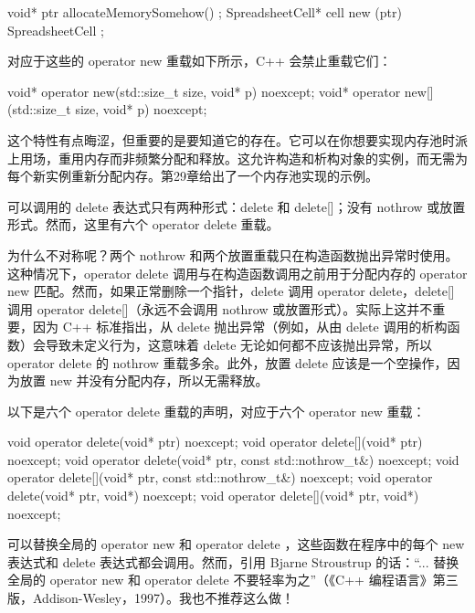 \begin{cpp}
void* ptr { allocateMemorySomehow() };
SpreadsheetCell* cell { new (ptr) SpreadsheetCell {} };
\end{cpp}

对应于这些的 operator new 重载如下所示，C++ 会禁止重载它们：

\begin{cpp}
void* operator new(std::size_t size, void* p) noexcept;
void* operator new[](std::size_t size, void* p) noexcept;
\end{cpp}

这个特性有点晦涩，但重要的是要知道它的存在。它可以在你想要实现内存池时派上用场，重用内存而非频繁分配和释放。这允许构造和析构对象的实例，而无需为每个新实例重新分配内存。第29章给出了一个内存池实现的示例。


可以调用的 delete 表达式只有两种形式：delete 和 delete[]；没有 nothrow 或放置形式。然而，这里有六个 operator delete 重载。

为什么不对称呢？两个 nothrow 和两个放置重载只在构造函数抛出异常时使用。这种情况下，operator delete 调用与在构造函数调用之前用于分配内存的 operator new 匹配。然而，如果正常删除一个指针，delete 调用 operator delete，delete[] 调用 operator delete[]（永远不会调用 nothrow 或放置形式）。实际上这并不重要，因为 C++ 标准指出，从 delete 抛出异常（例如，从由 delete 调用的析构函数）会导致未定义行为，这意味着 delete 无论如何都不应该抛出异常，所以 operator delete 的 nothrow 重载多余。此外，放置 delete 应该是一个空操作，因为放置 new 并没有分配内存，所以无需释放。

以下是六个 operator delete 重载的声明，对应于六个 operator new 重载：

\begin{cpp}
void operator delete(void* ptr) noexcept;
void operator delete[](void* ptr) noexcept;
void operator delete(void* ptr, const std::nothrow_t&) noexcept;
void operator delete[](void* ptr, const std::nothrow_t&) noexcept;
void operator delete(void* ptr, void*) noexcept;
void operator delete[](void* ptr, void*) noexcept;
\end{cpp}


可以替换全局的 operator new 和 operator delete ，这些函数在程序中的每个 new 表达式和 delete 表达式都会调用。然而，引用 Bjarne Stroustrup 的话：“... 替换全局的 operator new 和 operator delete 不要轻率为之”（《C++ 编程语言》第三版，Addison-Wesley，1997）。我也不推荐这么做！

